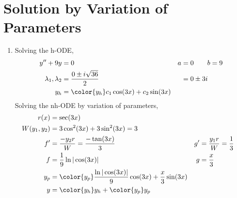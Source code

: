 \section{Solution by Variation of Parameters}

\begin{enumerate}
    \item Solving the h-ODE,
          \begin{align}
              y'' + 9y                 & = 0                          &
              a                        & = 0 \qquad b = 9               \\
              \lambda_{1}, \lambda_{2} & = \frac{0 \pm i\sqrt{36}}{2} &
                                       & = 0 \pm 3i                     \\
              y_{h}                    & = {\color{y_h} c_{1}\cos(3x)
              + c_{2}\sin(3x)}
          \end{align}
          Solving the nh-ODE by variation of parameters,
          \begin{align}
              r(x)            & = \sec(3x)                                        \\
              W(y_{1}, y_{2}) & = 3\cos^{2}(3x) + 3\sin^{2}(3x) = 3               \\
              f'              & = \frac{-y_{2}r}{W} = \frac{-\tan(3x)}{3}       &
              g'              & = \frac{y_{1}r}{W} = \frac{1}{3}                  \\
              f               & = \frac{1}{9}\ln|\cos(3x)|                      &
              g               & = \frac{x}{3}                                     \\
              y_{p}           & = {\color{y_p} \frac{\ln|\cos(3x)|}{9} \cos(3x)
              + \frac{x}{3}\sin(3x)}                                              \\
              y               & = {\color{y_h} y_{h}} + {\color{y_p} y_{p}}
          \end{align}


\end{enumerate}
